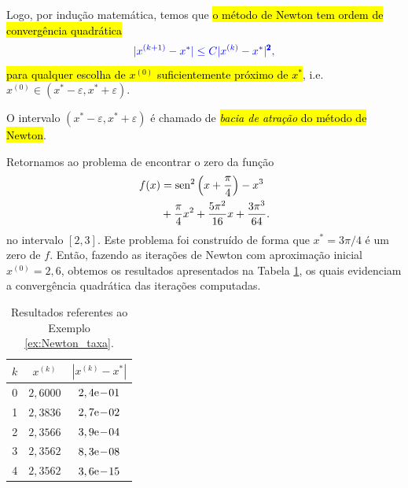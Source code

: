 Logo, por indução matemática, temos que \hl{o método de Newton tem ordem de convergência quadrática}
\begin{equation}\label{eq:Newton_taxa_quadratica}
  \color{blue}|x^{(k+1)}-x^*| \leq C|x^{(k)}-x^{*}|^{\pmb{2}},
\end{equation}
\hl{para qualquer escolha de $x^{(0)}$ suficientemente próximo de $x^*$}, i.e. $x^{(0)}\in (x^*-\varepsilon, x^*+\varepsilon)$.

\begin{obs}
  O intervalo $(x^*-\varepsilon, x^*+\varepsilon)$ é chamado de \hl{\emph{bacia de atração} do método de Newton}.
\end{obs}

\begin{ex}\label{ex:Newton_taxa}
  Retornamos ao problema de encontrar o zero da função
  \begin{equation}
    \begin{aligned}
      f(x) &= \operatorname{sen}^2\left(x+\frac{\pi}{4}\right) - x^3 \\
      &+ \frac{\pi}{4}x^2 + \frac{5\pi^2}{16}x + \frac{3\pi^3}{64}.
  \end{aligned}
  \end{equation}
  no intervalo $[2,3]$. Este problema foi construído de forma que $x^* = 3\pi/4$ é um zero de $f$. Então, fazendo as iterações de Newton com aproximação inicial $x^{(0)}=2,6$, obtemos os resultados apresentados na Tabela \ref{tab:ex_Newton_taxa}, os quais evidenciam a convergência quadrática das iterações computadas.

\begin{table}[h!]
  \centering
  \caption{Resultados referentes ao Exemplo \ref{ex:Newton_taxa}.}
  \label{tab:ex_Newton_taxa}
  \begin{tabular}{r|cc}
    $k$ & $x^{(k)}$ & $|x^{(k)}-x^*|$ \\\hline
    0 & $2,6000$ & $2,4\mathrm{e}\!-\!01$ \\
    1 & $2,3836$ & $2,7\mathrm{e}\!-\!02$ \\
    2 & $2,3566$ & $3,9\mathrm{e}\!-\!04$ \\
    3 & $2,3562$ & $8,3\mathrm{e}\!-\!08$ \\
    4 & $2,3562$ & $3,6\mathrm{e}\!-\!15$ \\\hline
  \end{tabular}
\end{table}

\end{ex}

